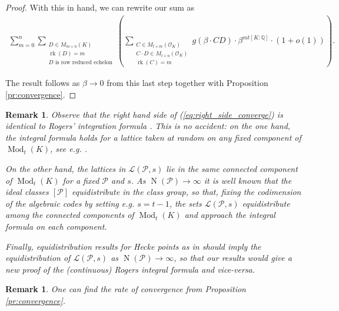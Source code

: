 \documentclass{amsart}
\newtheorem{remark}[theorem]{Remark}
\DeclareMathOperator{\ML}{Mod}
\DeclareMathOperator{\rank}{rk}
\DeclareMathOperator{\N}{N}
\begin{document}
\begin{proof}
With this in hand, we can rewrite our sum as 
\begin{align}
\sum_{m=0}^{{n}}\sum_{\substack{D \in M_{m \times n }(K) \\ 
\rank(D) = m \\ 
D \text{ is row reduced echelon}}}
\left(
\sum_{\substack{C \in M_{t \times m }(\mathcal{O}_K)  \\ C\cdot D \in M_{t \times n}(\mathcal{O}_K) \\ \rank(C) = m  }}
{  g( \beta \cdot C  D)}\cdot { \beta^{mt[K:\mathbb{Q}]} } \cdot (1+o(1)) \right).
\end{align}

\fi
The result follows as $\beta \rightarrow 0$ from this last step together with Proposition \ref{pr:convergence}.
\end{proof}

\begin{remark}
Observe that the right hand side of (\ref{eq:right_side_converge})
is identical to Rogers' integration formula \cite{K19, hughes2023mean, GSV23}. This is no accident: on the one hand, the integral formula holds for a lattice taken at random on any fixed component of $\ML_t(K)$, see e.g. \cite[Remark 7]{GSV23}. 

On the other hand, the lattices in $\mathcal{L}(\mathcal{P},s)$ lie in the same connected component of $\ML_t(K)$ for a fixed $\mathcal{P}$ and $s$. 
As $\N(\mathcal{P}) \rightarrow \infty$ it is well known that the ideal classes $[\mathcal{P}]$ equidistribute in the class group, so that, fixing the codimension of the algebraic codes by setting e.g. $s=t-1$, the sets $\mathcal{L}(\mathcal{P},s)$ equidistribute among the connected components of $\ML_t(K)$ and approach the integral formula on each component.


Finally, equidistribution results for Hecke points as in \cite{EOL01} should imply the equidistribution of $\mathcal{L}(\mathcal{P},s)$ as $\N(\mathcal{P}) \rightarrow \infty$, so that our results would give a new proof of the (continuous) Rogers integral formula and vice-versa.
\end{remark}


\begin{remark}
One can find the rate of convergence from Proposition \ref{pr:convergence}.
\end{remark}
\end{document}
